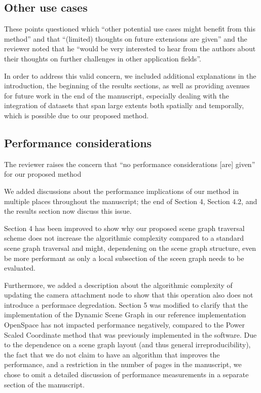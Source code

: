 \documentclass{article}
\begin{document}
\vspace*{1cm}

\begin{tcolorbox}
\subsection{Other use cases}\label{concern:applications}
These points questioned which ``other potential use cases might benefit from this method'' and that ``(limited) thoughts on future extensions are given'' and the reviewer noted that he ``would be very interested to hear from the authors about their thoughts on further challenges in other application fields''.
\end{tcolorbox}
In order to address this valid concern, we included additional explanations in the introduction, the beginning of the results sections, as well as providing avenues for future work in the end of the manuscript, especially dealing with the integration of datasets that span large extents both spatially and temporally, which is possible due to our proposed method.

\vspace*{1cm}

\begin{tcolorbox}
\subsection{Performance considerations}\label{concern:performance}
The reviewer raises the concern that ``no performance considerations [are] given'' for our proposed method
\end{tcolorbox}
We added discussions about the performance implications of our method in multiple places throughout the manuscript; the end of Section 4, Section 4.2, and the results section now discuss this issue.

Section 4 has been improved to show why our proposed scene graph traversal scheme does not increase the algorithmic complexity compared to a standard scene graph traversal and might, dependening on the scene graph structure, even be more performant as only a local subsection of the sceen graph needs to be evaluated.

Furthermore, we added a description about the algorithmic complexity of updating the camera attachment node to show that this operation also does not introduce a performace degredation.
Section 5 was modified to clarify that the implementation of the Dynamic Scene Graph in our reference implementation OpenSpace has not impacted performance negatively, compared to the Power Scaled Coordinate method that was previously implemented in the software.
Due to the dependence on a scene graph layout (and thus general irreproducibility), the fact that we do not claim to have an algorithm that improves the performance, and a restriction in the number of pages in the manuscript, we chose to omit a detailed discussion of performance measurements in a separate section of the manuscript.
\end{document}
